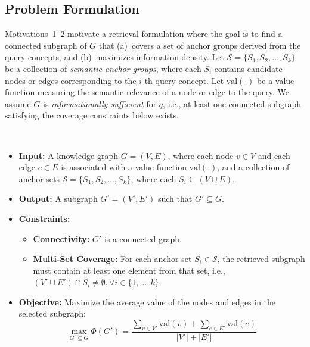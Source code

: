 \subsection{Problem Formulation}

Motivations~1--2 motivate a retrieval formulation where the goal is to find a connected subgraph of $G$ that (a)~covers a set of anchor groups derived from the query concepts, and (b)~maximizes information density. Let $\mathcal{S} = \{S_1, S_2, \dots, S_k\}$ be a collection of \emph{semantic anchor groups}, where each $S_i$ contains candidate nodes or edges corresponding to the $i$-th query concept. Let $\mathrm{val}(\cdot)$ be a value function measuring the semantic relevance of a node or edge to the query. We assume $G$ is \emph{informationally sufficient} for $q$, i.e., at least one connected subgraph satisfying the coverage constraints below exists.

\begin{defn}\label{defn:OISR}
~\\
\begin{itemize}[leftmargin=1.5em]
    \item \textbf{Input:}
    A knowledge graph $G=(V,E)$, where each node $v \in V$ and each edge $e \in E$ is associated with a value function $\mathrm{val}(\cdot)$, and a collection of anchor sets $\mathcal{S} = \{S_1, S_2, \dots, S_k\}$, where each $S_i \subseteq (V \cup E)$.

    \item \textbf{Output:}
    A subgraph $G'=(V',E')$ such that $G' \subseteq G$.

    \item \textbf{Constraints:}
    \begin{itemize}
        \item \textbf{Connectivity:} $G'$ is a connected graph.
        \item \textbf{Multi-Set Coverage:} For each anchor set $S_i \in \mathcal{S}$, the retrieved subgraph must contain at least one element from that set, i.e., $(V' \cup E') \cap S_i \neq \emptyset, \forall i \in \{1, \dots, k\}$.
    \end{itemize}

    \item \textbf{Objective:}
    Maximize the average value of the nodes and edges in the selected subgraph:
    \begin{equation}
        \max_{G' \subseteq G} \Phi(G') = \frac{\sum_{v \in V'} \mathrm{val}(v) + \sum_{e \in E'} \mathrm{val}(e)}{|V'| + |E'|}
    \end{equation}
\end{itemize}
\end{defn}

